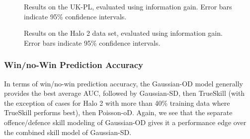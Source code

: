 \begin{center}
\begin{figure*}[t!]
 \centering
\caption{\small Results on the UK-PL, evaluated
using information gain. Error bars indicate
95\% confidence intervals.}
\label{fig:InforGain_UK}
\end{figure*}
\end{center}

\begin{center}
\begin{figure*}[t!]
 \centering
\caption{\small Results on the Halo 2 data set, evaluated
using information gain. Error bars indicate
95\% confidence intervals.}
\label{fig:InforGain_Halo}
\end{figure*}
\end{center}



\subsubsection{Win/no-Win Prediction Accuracy }

In terms of win/no-win prediction accuracy,
the Gaussian-OD model generally
provides the best average AUC, followed by Gaussian-SD, then
TrueSkill (with the exception of cases for Halo 2 with more than 40\%
training data where TrueSkill performs best), then Poisson-oD.
Again, we see that
the separate offence/defence skill modeling of Gaussian-OD gives
it a performance edge over the combined skill model of Gaussian-SD.



